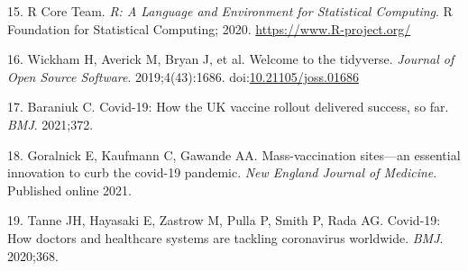 \documentclass{article}
\begin{document}
\leavevmode\hypertarget{ref-R-base}{}%
15. R Core Team. \emph{R: A Language and Environment for Statistical
Computing}. R Foundation for Statistical Computing; 2020.
\url{https://www.R-project.org/}

\leavevmode\hypertarget{ref-tidyverse2019}{}%
16. Wickham H, Averick M, Bryan J, et al. Welcome to the tidyverse.
\emph{Journal of Open Source Software}. 2019;4(43):1686.
doi:\href{https://doi.org/10.21105/joss.01686}{10.21105/joss.01686}

\leavevmode\hypertarget{ref-baraniuk2021covid}{}%
17. Baraniuk C. Covid-19: How the UK vaccine rollout delivered success,
so far. \emph{BMJ}. 2021;372.

\leavevmode\hypertarget{ref-goralnick2021mass}{}%
18. Goralnick E, Kaufmann C, Gawande AA. Mass-vaccination sites---an
essential innovation to curb the covid-19 pandemic. \emph{New England
Journal of Medicine}. Published online 2021.

\leavevmode\hypertarget{ref-tanne2020covid}{}%
19. Tanne JH, Hayasaki E, Zastrow M, Pulla P, Smith P, Rada AG.
Covid-19: How doctors and healthcare systems are tackling coronavirus
worldwide. \emph{BMJ}. 2020;368.



\end{document}
